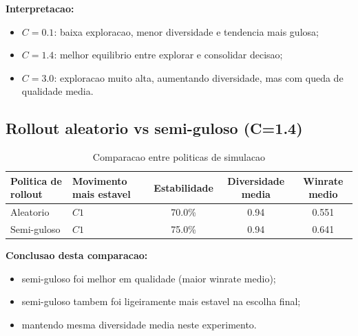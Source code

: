 \textbf{Interpretacao:}
\begin{itemize}[leftmargin=1.5em]
  \item $C=0.1$: baixa exploracao, menor diversidade e tendencia mais gulosa;
  \item $C=1.4$: melhor equilibrio entre explorar e consolidar decisao;
  \item $C=3.0$: exploracao muito alta, aumentando diversidade, mas com queda de qualidade media.
\end{itemize}

\subsection{Rollout aleatorio vs semi-guloso (C=1.4)}
\begingroup
\footnotesize
\setlength{\tabcolsep}{4pt}
\begin{table}[H]
\centering
\begin{tabular}{p{2.3cm} p{2.6cm} c c c}
\toprule
Politica de rollout & Movimento mais estavel & Estabilidade & Diversidade media & Winrate medio \\
\midrule
Aleatorio & $C1$ & 70.0\% & 0.94 & 0.551 \\
Semi-guloso & $C1$ & 75.0\% & 0.94 & 0.641 \\
\bottomrule
\end{tabular}
\caption{Comparacao entre politicas de simulacao}
\end{table}
\endgroup

\textbf{Conclusao desta comparacao:}
\begin{itemize}[leftmargin=1.5em]
  \item semi-guloso foi melhor em qualidade (maior winrate medio);
  \item semi-guloso tambem foi ligeiramente mais estavel na escolha final;
  \item mantendo mesma diversidade media neste experimento.
\end{itemize}


